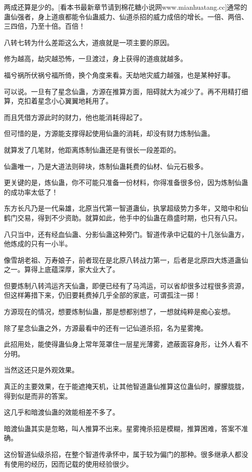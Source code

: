 \begin{this_body}
两成还算是少的。[看本书最新章节请到棉花糖小说网www.mianhuatang.cc]通常的蛊仙强者，身上道痕都能令仙蛊威力、仙道杀招的威力成倍的增长。一倍、两倍、三四倍，乃至十倍。百倍！

八转七转为什么差距这么大，道痕就是一项主要的原因。

修为越高，劫灾越恐怖，一旦渡过，身上获得的道痕就越多。

福兮祸所伏祸兮福所倚，换个角度来看。天劫地灾威力越强，也是某种好事。

可以说。一旦有了星念仙蛊，方源在推算方面，阻碍就大为减少了。再不用精打细算，克扣着星念小心翼翼地耗用了。

而且凭借方源此时的财力，他也能消耗得起了。

但可惜的是，方源能支撑得起使用仙蛊的消耗，却没有财力炼制仙蛊。

就算发了几笔财，他距离炼制仙蛊还是有很长一段差距的。

仙蛊唯一，乃是大道法则碎块，炼制仙蛊耗费的仙材、仙元石极多。

更关键的是，炼仙蛊，你不可能只准备一份材料，你得准备很多份，因为炼制仙蛊的成功率太低了！

东方长凡乃是一代枭雄，北原当代第一智道蛊仙，执掌超级势力多年，又暗中和仙鹤门交易，得到不少资助。就算如此，他手中的仙蛊在鼎盛时期，也只有八只。

八只当中，还有经血仙蛊、分影仙蛊这种旁门。智道传承中记载的十几张仙蛊方，他炼成的只有一小半。

像雪胡老祖、万寿娘子，前者现在是北原八转战力第一，后者是北原四大炼道蛊仙之一。算得上底蕴深厚，家大业大了。

但要炼制八转鸿运齐天仙蛊，即便已经有了马鸿运，可以省却很多过程很多资源，但这样筹措下来，仍旧要耗费掉几乎全部的家底，可谓孤注一掷！

方源现在的情况，想要炼制仙蛊，那是想都别想了，一想就纯粹是痴心妄想。

除了星念仙蛊之外，方源最看中的还有一记仙道杀招，名为星雾掩。

此招用处，能使得蛊仙身上常年笼罩住一层星光薄雾，遮蔽面容身形，让外人看不分明。

当然这还只是外观效果。

真正的主要效果，在于能遮掩天机，让其他智道蛊仙推算这位蛊仙时，朦朦胧胧，得到似是而非的答案。

这几乎和暗渡仙蛊的效能相差不多了。

暗渡仙蛊其实是忽略，叫人推算不出来。星雾掩杀招是模糊，推算困难，答案不准确。

这份智道仙级杀招，在整个智道传承怀中，属于较为偏门的那种。很多继承人都没有使用的经历，因而记载的使用经验很少。


\end{this_body}
